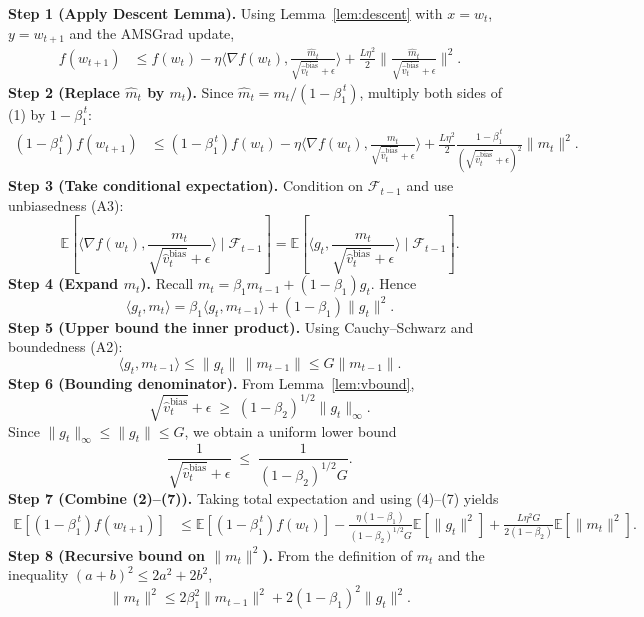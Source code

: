 \documentclass{article}
\newcommand{\E}{\mathbb{E}}
\begin{document}
\noindent\textbf{Step 1 (Apply Descent Lemma).}  
Using Lemma~\ref{lem:descent} with $x=w_t$, $y=w_{t+1}$ and the AMSGrad update,
\begin{align}
f(w_{t+1}) &\le f(w_t)-\eta\Big\langle\nabla f(w_t),\frac{\hat m_t}{\sqrt{\hat v_t^{\text{bias}}}+\epsilon}\Big\rangle
+\frac{L\eta^2}{2}\Big\|\frac{\hat m_t}{\sqrt{\hat v_t^{\text{bias}}}+\epsilon}\Big\|^2 .
\tag{1}
\end{align}
\noindent\textbf{Step 2 (Replace $\hat m_t$ by $m_t$).}  
Since $\hat m_t=m_t/(1-\beta_1^{\,t})$, multiply both sides of (1) by $1-\beta_1^{\,t}$:
\begin{align}
(1-\beta_1^{\,t})f(w_{t+1}) &\le (1-\beta_1^{\,t})f(w_t)
-\eta\Big\langle\nabla f(w_t),\frac{m_t}{\sqrt{\hat v_t^{\text{bias}}}+\epsilon}\Big\rangle
+\frac{L\eta^2}{2}\frac{1-\beta_1^{\,t}}{(\sqrt{\hat v_t^{\text{bias}}}+\epsilon)^2}\|m_t\|^2 .
\tag{2}
\end{align}
\noindent\textbf{Step 3 (Take conditional expectation).}  
Condition on $\mathcal{F}_{t-1}$ and use unbiasedness (A3):
\[
\E\!\left[\langle\nabla f(w_t),\frac{m_t}{\sqrt{\hat v_t^{\text{bias}}}+\epsilon}\rangle\mid\mathcal{F}_{t-1}\right]
= \E\!\left[\langle g_t,\frac{m_t}{\sqrt{\hat v_t^{\text{bias}}}+\epsilon}\rangle\mid\mathcal{F}_{t-1}\right].
\tag{3}
\]
\noindent\textbf{Step 4 (Expand $m_t$).}  
Recall $m_t=\beta_1 m_{t-1}+(1-\beta_1)g_t$.
Hence
\[
\langle g_t,m_t\rangle
= \beta_1\langle g_t,m_{t-1}\rangle+(1-\beta_1)\|g_t\|^2 .
\tag{4}
\]
\noindent\textbf{Step 5 (Upper bound the inner product).}  
Using Cauchy–Schwarz and boundedness (A2):
\[
\langle g_t,m_{t-1}\rangle\le \|g_t\|\,\|m_{t-1}\|
\le G\|m_{t-1}\|.
\tag{5}
\]
\noindent\textbf{Step 6 (Bounding denominator).}  
From Lemma~\ref{lem:vbound},
\[
\sqrt{\hat v_t^{\text{bias}}}+\epsilon\;\ge\;(1-\beta_2)^{1/2}\|g_t\|_{\infty} .
\tag{6}
\]
Since $\|g_t\|_{\infty}\le\|g_t\|\le G$, we obtain a uniform lower bound
\[
\frac{1}{\sqrt{\hat v_t^{\text{bias}}}+\epsilon}\;\le\;\frac{1}{(1-\beta_2)^{1/2}G}.
\tag{7}
\]
\noindent\textbf{Step 7 (Combine (2)–(7)).}  
Taking total expectation and using (4)–(7) yields
\begin{align}
\E[(1-\beta_1^{\,t})f(w_{t+1})] &\le \E[(1-\beta_1^{\,t})f(w_t)]
-\frac{\eta(1-\beta_1)}{(1-\beta_2)^{1/2}G}\E[\|g_t\|^2]
+\frac{L\eta^2 G}{2(1-\beta_2)}\E[\|m_t\|^2] .
\tag{8}
\end{align}
\noindent\textbf{Step 8 (Recursive bound on $\|m_t\|^2$).}  
From the definition of $m_t$ and the inequality $(a+b)^2\le 2a^2+2b^2$,
\[
\|m_t\|^2\le 2\beta_1^2\|m_{t-1}\|^2+2(1-\beta_1)^2\|g_t\|^2 .
\tag{9}
\]
\end{document}
